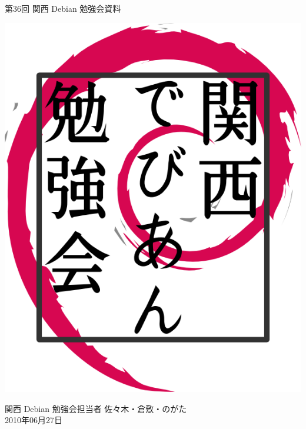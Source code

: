 \documentclass[mingoth,a4paper]{jsarticle}
\newcommand{\debmtgyear}{2010}
\newcommand{\debmtgdate}{27}
\newcommand{\debmtgmonth}{06}
\newcommand{\debmtgnumber}{36}
\begin{document}
\begin{titlepage}


 第\debmtgnumber{}回 関西 Debian 勉強会資料

\vspace{2cm}

\begin{center}
\includegraphics{image200802/kansaidebianlogo.png}
\end{center}

\begin{flushright}
\hfill{}関西 Debian 勉強会担当者 佐々木・倉敷・のがた \\
\hfill{}\debmtgyear{}年\debmtgmonth{}月\debmtgdate{}日
\end{flushright}

\thispagestyle{empty}
\end{titlepage}


\subsection*{}%
 
\end{document}
